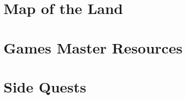 \documentclass[a4paper,openany]{book}
\begin{document}

\begin{multicols}{2}

\tableofcontents

\end{multicols}

\pagebreak




\part{Map of the Land}







\part{Games Master Resources}





\part{Side Quests}



\startcontents[town]
\startcontents[villages]
\startcontents[forest]
\stopcontents[town]
\stopcontents[villages]
\stopcontents[forest]









\printglossary

\printindex
\end{document}
